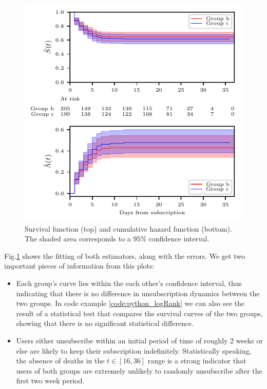 \documentclass[paper=a4, fontsize=10pt]{report}
\begin{document}
\begin{figure}[h!]
\centering
\captionsetup{justification=centering}
\includegraphics[scale = 0.9]{survival.pdf}
\caption{Survival function (top) and cumulative hazard function (bottom). The shaded area corresponds to a $95\%$ confidence
interval.}
\label{fig:survival}
\end{figure}


Fig.\ref{fig:survival} shows the fitting of both estimators, along with the errors. We get two important pieces of information
from this plots:
\begin{itemize}
 \item Each group's curve lies within the each other's confidence interval, thus indicating that there is no difference in unsubscription dynamics between the two groups.
 In code example \ref{code:python_logRank} we can also see the result of a statistical test
that compares the survival curves of the two groups, showing that there is no significant statistical difference.

 \item  Users either unsubscribe within an initial period of time of roughly 2 weeks or else are likely to keep their subscription indefinitely. Statistically
speaking, the absence of deaths in the $t \in [16,36]$ range is a strong indicator that users of both groups are extremely unlikely to randomly
unsubscribe after the first two week period.
\end{itemize}
\end{document}
